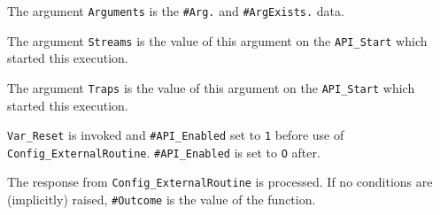 The argument \texttt{Arguments} is the \texttt{\#Arg.} and
\texttt{\#ArgExists.} data.

The argument \texttt{Streams} is the value of this argument on the
\texttt{API\_Start} which started this execution.

The argument \texttt{Traps} is the value of this argument on the
\texttt{API\_Start} which started this execution.

\texttt{Var\_Reset} is invoked and \texttt{\#API\_Enabled} set to
\texttt{\textquotesingle{}1\textquotesingle{}} before use of
\texttt{Config\_ExternalRoutine}. \texttt{\#API\_Enabled} is set to
\texttt{\textquotesingle{}O\textquotesingle{}} after.

The response from \texttt{Config\_ExternalRoutine} is processed. If no
conditions are (implicitly) raised, \texttt{\#Outcome} is the value of
the function.
